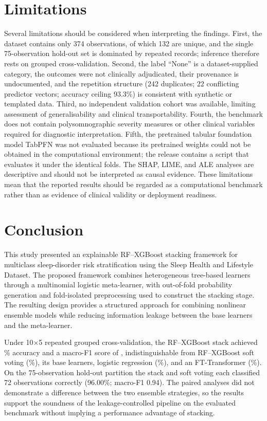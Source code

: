 \documentclass[a4paper,fleqn]{cas-dc}
\begin{document}
\section{Limitations}
\label{sec:limitations}

Several limitations should be considered when interpreting the findings. First, the dataset contains only 374 observations, of which 132 are unique, and the single 75-observation hold-out set is dominated by repeated records; inference therefore rests on grouped cross-validation. Second, the label ``None'' is a dataset-supplied category, the outcomes were not clinically adjudicated, their provenance is undocumented, and the repetition structure (242 duplicates; 22 conflicting predictor vectors; accuracy ceiling 93.3\%) is consistent with synthetic or templated data. Third, no independent validation cohort was available, limiting assessment of generalisability and clinical transportability. Fourth, the benchmark does not contain polysomnographic severity measures or other clinical variables required for diagnostic interpretation. Fifth, the pretrained tabular foundation model TabPFN \cite{hollmann2025} was not evaluated because its pretrained weights could not be obtained in the computational environment; the release contains a script that evaluates it under the identical folds. The SHAP, LIME, and ALE analyses are descriptive and should not be interpreted as causal evidence. These limitations mean that the reported results should be regarded as a computational benchmark rather than as evidence of clinical validity or deployment readiness.



\section{Conclusion}
\label{sec:conclusion}

This study presented an explainable RF--XGBoost stacking framework for multiclass sleep-disorder risk stratification using the Sleep Health and Lifestyle Dataset. The proposed framework combines heterogeneous tree-based learners through a multinomial logistic meta-learner, with out-of-fold probability generation and fold-isolated preprocessing used to construct the stacking stage. The resulting design provides a structured approach for combining nonlinear ensemble models while reducing information leakage between the base learners and the meta-learner.

Under 10$\times$5 repeated grouped cross-validation, the RF--XGBoost stack achieved \AccStackG\% accuracy and a macro-F1 score of \FStackG, indistinguishable from RF--XGBoost soft voting (\AccVoteG\%), its base learners, logistic regression (\AccLRG\%), and an FT-Transformer (\AccFTTG\%). On the 75-observation hold-out partition the stack and soft voting each classified 72 observations correctly (96.00\%; macro-F1 0.94). The paired analyses did not demonstrate a difference between the two ensemble strategies, so the results support the soundness of the leakage-controlled pipeline on the evaluated benchmark without implying a performance advantage of stacking.
\end{document}
